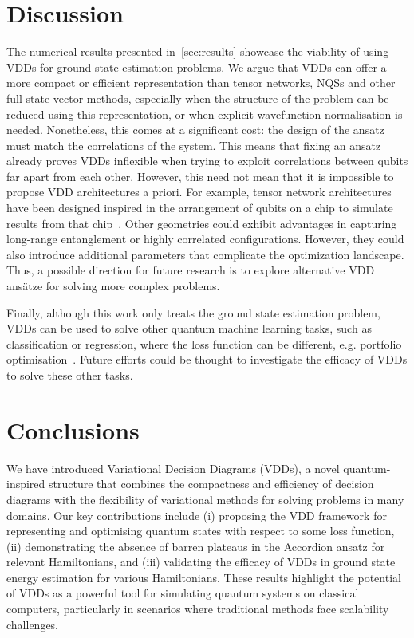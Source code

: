 \documentclass{ieeeaccess}
\begin{document}
\section{Discussion}\label{sec:discussion}
The numerical results presented in~\cref{sec:results} showcase the viability of using VDDs for ground state estimation problems.
We argue that VDDs can offer a more compact or efficient representation than tensor networks, NQSs and other full state-vector methods, especially when the structure of the problem can be reduced using this representation, or when explicit wavefunction normalisation is needed.
Nonetheless, this comes at a significant cost: the design of the ansatz must match the correlations of the system.
This means that fixing an ansatz already proves VDDs inflexible when trying to exploit correlations between qubits far apart from each other.
However, this need not mean that it is impossible to propose VDD architectures a priori.
For example, tensor network architectures have been designed inspired in the arrangement of qubits on a chip to simulate results from that chip~\cite{tindall2024efficient,patra2024efficient}.
Other geometries could exhibit advantages in capturing long-range entanglement or highly correlated configurations.
However, they could also introduce additional parameters that complicate the optimization landscape.
Thus, a possible direction for future research is to explore alternative VDD ansätze for solving more complex problems.

Finally, although this work only treats the ground state estimation problem, VDDs can be used to solve other quantum machine learning tasks, such as classification or regression, where the loss function can be different, e.g. portfolio optimisation~\cite{alcazar2024enhancing}.
Future efforts could be thought to investigate the efficacy of VDDs to solve these other tasks.


\section{Conclusions}\label{sec:conclusions}

We have introduced Variational Decision Diagrams (VDDs), a novel quantum-inspired structure that combines the compactness and efficiency of decision diagrams with the flexibility of variational methods for solving problems in many domains.
Our key contributions include (i) proposing the VDD framework for representing and optimising quantum states with respect to some loss function, (ii) demonstrating the absence of barren plateaus in the Accordion ansatz for relevant Hamiltonians, and (iii) validating the efficacy of VDDs in ground state energy estimation for various Hamiltonians.
These results highlight the potential of VDDs as a powerful tool for simulating quantum systems on classical computers, particularly in scenarios where traditional methods face scalability challenges.
\end{document}
